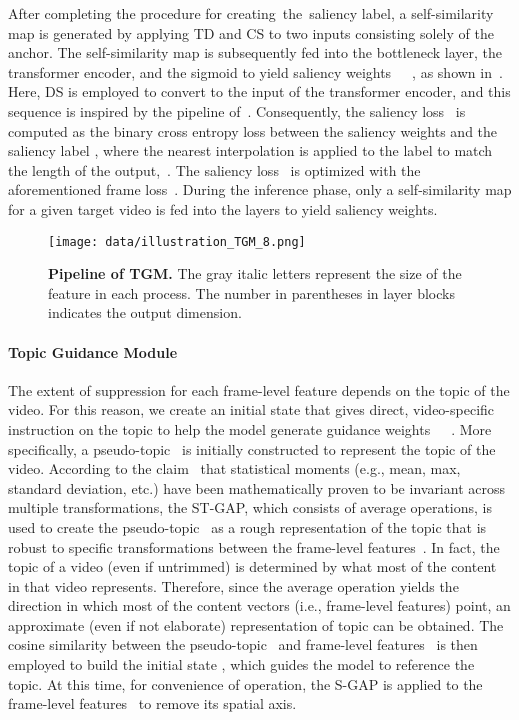 \documentclass[10pt,twocolumn,letterpaper]{article}
\begin{document}
            After completing the procedure for creating the saliency label, a self-similarity map is generated by applying TD and CS to two inputs consisting solely of the anchor. The self-similarity map is subsequently fed into the bottleneck layer, the transformer encoder, and the sigmoid to yield saliency weights~~~, as shown in~. Here, DS is employed to convert to the input of the transformer encoder, and this sequence is inspired by the pipeline of~\cite{kang2022uboco}. Consequently, the saliency loss~ is computed as the binary cross entropy loss between the saliency weights  and the saliency label , where the nearest interpolation is applied to the label to match the length of the output,~. The saliency loss~ is optimized with the aforementioned frame loss~. During the inference phase, only a self-similarity map for a given target video is fed into the layers to yield saliency weights.
            
        
            \vspace{-4mm}
            
        \begin{figure}[t!]
            \centering
            \texttt{[image: data/illustration\_TGM\_8.png]} 
            \vspace{-3mm}
            \caption{\textbf{Pipeline of TGM.} The gray italic letters represent the size of the feature in each process. The number in parentheses in layer blocks indicates the output dimension. \vspace{-3mm}} \label{fig:tgm}
        \end{figure}
        \paragraph{Topic Guidance Module \\}
        
            The extent of suppression for each frame-level feature depends on the topic of the video. For this reason, we create an initial state  that gives direct, video-specific instruction on the topic to help the model generate guidance weights~~~. More specifically, a pseudo-topic~ is initially constructed to represent the topic of the video. According to the claim~\cite{lin2017hnip} that statistical moments (e.g., mean, max, standard deviation, etc.) have been mathematically proven to be invariant across multiple transformations, the ST-GAP, which consists of average operations, is used to create the pseudo-topic~ as a rough representation of the topic that is robust to specific transformations between the frame-level features~. In fact, the topic of a video (even if untrimmed) is determined by what most of the content in that video represents. Therefore, since the average operation yields the direction in which most of the content vectors (i.e., frame-level features) point, an approximate (even if not elaborate) representation of topic can be obtained. The cosine similarity between the pseudo-topic~ and frame-level features~ is then employed to build the initial state , which guides the model to reference the topic. At this time, for convenience of operation, the S-GAP is applied to the frame-level features~ to remove its spatial axis.
\end{document}

